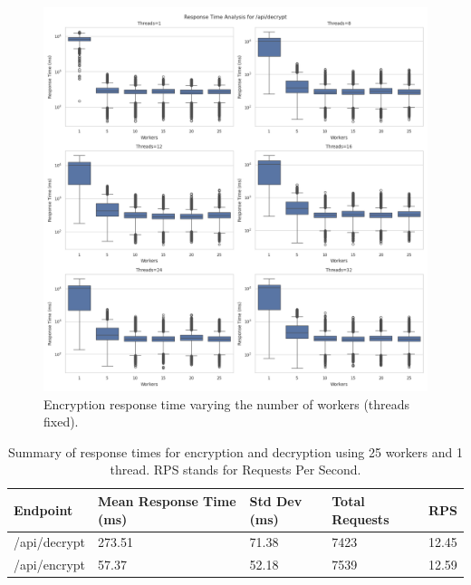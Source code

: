 \documentclass[cic,tc,english]{iiufrgs}
\numberwithin{algorithm}{chapter}
\begin{document}
        \begin{figure}
            \centering
            \includegraphics[width=\textwidth]{images/phase1/api_decrypt/response_time_threads_summary.png}
            \caption{Encryption response time varying the number of workers (threads fixed).}
            \label{fig:encrypt_response_time_threads}
        \end{figure}

        \begin{table}
                \centering
                \begin{tabular}{|l|l|l|l|l|}
                \hline
                    Endpoint & Mean Response Time (ms) & Std Dev (ms) & Total Requests & RPS \\ \hline
                    /api/decrypt & 273.51 & 71.38 & 7423 & 12.45 \\ \hline
                    /api/encrypt & 57.37 & 52.18 & 7539 & 12.59 \\ \hline
                \end{tabular}
                \caption{Summary of response times for encryption and decryption using 25 workers and 1 thread. RPS stands for Requests Per Second.}
                \label{tab:response_times}
            \end{table}
\end{document}
